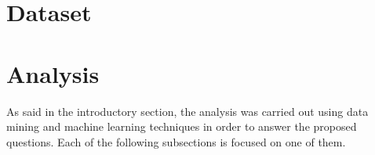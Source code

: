 \documentclass[11pt,a4paper]{article}
\begin{document}
\section{Dataset}

\section{Analysis}
As said in the introductory section, the analysis was carried out using data
mining and machine learning techniques in order to answer the proposed
questions. Each of the following subsections is focused on one of them.
\end{document}
